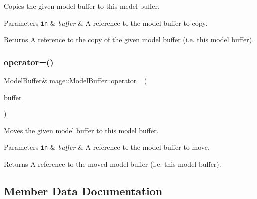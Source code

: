 Copies the given model buffer to this model buffer.


\begin{DoxyParams}[1]{Parameters}
\mbox{\tt in}  & {\em buffer} & A reference to the model buffer to copy. \\
\hline
\end{DoxyParams}
\begin{DoxyReturn}{Returns}
A reference to the copy of the given model buffer (i.\+e. this model buffer). 
\end{DoxyReturn}
\hypertarget{structmage_1_1_model_buffer_a2f2c8c5ec6a43c239f349e3c015320e0}{}\label{structmage_1_1_model_buffer_a2f2c8c5ec6a43c239f349e3c015320e0} 
\subsubsection{\texorpdfstring{operator=()}{operator=()}\hspace{0.1cm}{\footnotesize\ttfamily [2/2]}}
{\footnotesize\ttfamily \hyperlink{structmage_1_1_model_buffer}{Model\+Buffer}\& mage\+::\+Model\+Buffer\+::operator= (\begin{DoxyParamCaption}\item[{\hyperlink{structmage_1_1_model_buffer}{Model\+Buffer} \&\&}]{buffer }\end{DoxyParamCaption})\hspace{0.3cm}{\ttfamily [default]}}

Moves the given model buffer to this model buffer.


\begin{DoxyParams}[1]{Parameters}
\mbox{\tt in}  & {\em buffer} & A reference to the model buffer to move. \\
\hline
\end{DoxyParams}
\begin{DoxyReturn}{Returns}
A reference to the moved model buffer (i.\+e. this model buffer). 
\end{DoxyReturn}


\subsection{Member Data Documentation}
\hypertarget{structmage_1_1_model_buffer_a02ca2c0745b7687734c3c613a3d845cc}{}\label{structmage_1_1_model_buffer_a02ca2c0745b7687734c3c613a3d845cc} 
